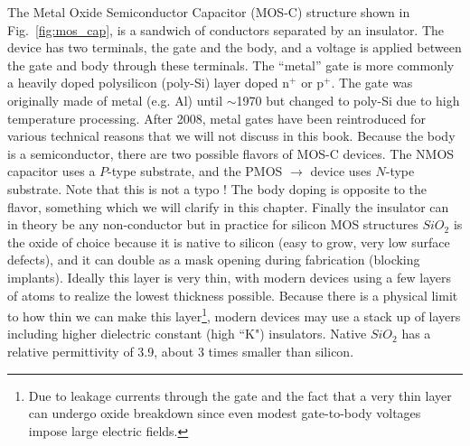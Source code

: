 The Metal Oxide Semiconductor Capacitor (MOS-C) structure shown in Fig.~\ref{fig:mos_cap},  is a sandwich of conductors separated by an insulator.  The device has two terminals, the gate and the body, and a voltage is applied between the gate and body through these terminals.  The  “metal” gate is more commonly a heavily doped polysilicon (poly-Si) layer doped n$^+$ or p$^+$.  The gate was originally made of metal (e.g. Al) until $\sim$1970 but changed to poly-Si due to high temperature processing. After 2008, metal gates have been reintroduced for various technical reasons that we will not discuss in this book.  Because the body is a semiconductor, there are two possible flavors of MOS-C devices.  The NMOS capacitor uses a  $P$-type substrate, and the PMOS  $\rightarrow$ device uses $N$-type substrate.  Note that this is not a typo !  The body doping is opposite to the flavor, something which we will clarify in this chapter.  Finally the insulator can in theory be any non-conductor but in practice for silicon MOS structures $SiO_2$ is the oxide of choice because it is native to silicon (easy to grow, very low surface defects), and it can double as a mask opening during fabrication (blocking implants).  Ideally this layer is very thin, with modern devices using a few layers of atoms to realize the lowest thickness possible.  Because there is a physical limit to how thin we can make this layer\footnote{Due to leakage currents through the gate and the fact that a very thin layer can undergo oxide breakdown since even modest gate-to-body voltages impose large electric fields.}, modern devices may use a stack up of layers including higher dielectric constant (high ``K") insulators.  Native $SiO_2$ has a relative permittivity of 3.9, about 3 times smaller than silicon.
